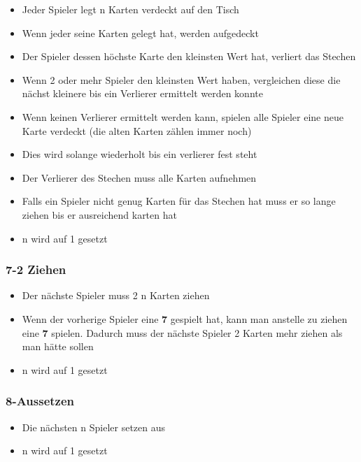 \documentclass[10pt,a4paper]{article}
\begin{document}
\begin{itemize}
\item
  Jeder Spieler legt n Karten verdeckt auf den Tisch
\item
  Wenn jeder seine Karten gelegt hat, werden aufgedeckt
\item
  Der Spieler dessen höchste Karte den kleinsten Wert hat, verliert das
  Stechen
\item
  Wenn 2 oder mehr Spieler den kleinsten Wert haben, vergleichen diese
  die nächst kleinere bis ein Verlierer ermittelt werden konnte
\item
  Wenn keinen Verlierer ermittelt werden kann, spielen alle Spieler eine
  neue Karte verdeckt (die alten Karten zählen immer noch)
\item
  Dies wird solange wiederholt bis ein verlierer fest steht
\item
  Der Verlierer des Stechen muss alle Karten aufnehmen
\item
  Falls ein Spieler nicht genug Karten für das Stechen hat muss er so
  lange ziehen bis er ausreichend karten hat
\item
  n wird auf 1 gesetzt
\end{itemize}

\subsubsection{7-2 Ziehen}\label{ziehen-1}

\begin{itemize}
\item
  Der nächste Spieler muss 2 n Karten ziehen
\item
  Wenn der vorherige Spieler eine \textbf{7} gespielt hat, kann man
  anstelle zu ziehen eine \textbf{7} spielen. Dadurch muss der nächste
  Spieler 2 Karten mehr ziehen als man hätte sollen
\item
  n wird auf 1 gesetzt
\end{itemize}

\subsubsection{8-Aussetzen}\label{aussetzen}

\begin{itemize}
\item
  Die nächsten n Spieler setzen aus
\item
  n wird auf 1 gesetzt
\end{itemize}
\end{document}
